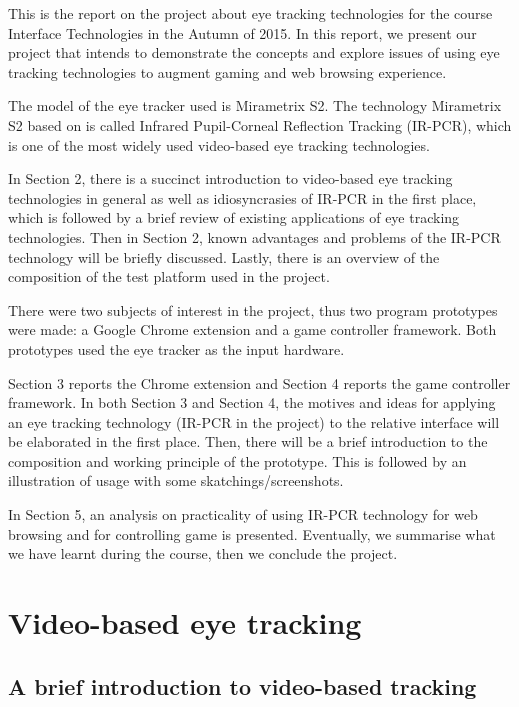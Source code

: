 \documentclass[english]{tktltiki}
\begin{document}
This is the report on the project about eye tracking technologies for the course Interface Technologies in the Autumn of 2015. In this report, we present our project that intends to demonstrate the concepts and explore issues of using eye tracking technologies to augment gaming and web browsing experience.  

The model of the eye tracker used is Mirametrix S2. The technology Mirametrix S2 based on is called Infrared Pupil-Corneal Reflection Tracking (IR-PCR), which is one of the most widely used video-based eye tracking technologies. 

In Section 2, there is a succinct introduction to video-based eye tracking technologies in general as well as idiosyncrasies of IR-PCR in the first place, which is followed by a brief review of existing applications of eye tracking technologies. Then in Section 2, known advantages and problems of the IR-PCR technology will be briefly discussed. Lastly, there is an overview of the composition of the test platform used in the project.

There were two subjects of interest in the project, thus two program prototypes were made: a Google Chrome extension and a game controller framework.  Both prototypes used the eye tracker as the input hardware.

Section 3 reports the Chrome extension and Section 4 reports the game controller framework. In both Section 3 and Section 4, the motives and ideas for applying an eye tracking technology (IR-PCR in the project) to the relative interface will be elaborated in the first place. Then, there will be a brief introduction to the composition and working principle of the prototype. This is followed by an illustration of usage with some skatchings/screenshots. 

In Section 5,  an analysis on practicality of using IR-PCR technology for web browsing and for controlling game is presented. Eventually, we summarise what we have learnt during the course, then we conclude the project.


\section{Video-based eye tracking}

\subsection{A brief introduction to video-based tracking}
\end{document}
